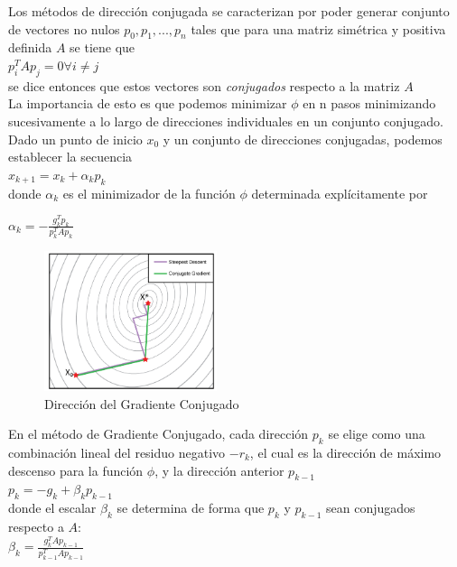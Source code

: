 \documentclass[10pt,journal,compsoc]{styles/IEEEtran}
\begin{document}
Los métodos de dirección conjugada se caracterizan por poder generar conjunto de vectores no nulos ${p_0,p_1,...,p_n}$ tales que para una matriz simétrica y positiva definida $A$ se tiene que\\

$p_i^T A p_j=0 \forall i\neq j$\\

se dice entonces que estos vectores son \emph{conjugados} respecto a la matriz $A$\\

La importancia de esto es que podemos minimizar $\phi$ en n pasos minimizando sucesivamente a lo largo de direcciones individuales en un conjunto conjugado. Dado un punto de inicio $x_0$ y un conjunto de direcciones conjugadas, podemos establecer la secuencia\\

$x_{k+1}=x_k+\alpha_k p_k$\\

donde $\alpha_k$ es el minimizador de la función $\phi$ determinada explícitamente por

$\alpha_k=-\frac{g_k^T p_k}{p_k^T A p_k}$

\begin{figure}[hbtp]
\centering
\includegraphics[width=0.45\textwidth]{conjugateGradient.png}
\caption{Dirección del Gradiente Conjugado}
\end{figure}
 
En el método de Gradiente Conjugado, cada dirección $p_k$ se elige como una combinación lineal del residuo negativo $-r_k$, el cual es la dirección de máximo descenso para la función $\phi$, y la dirección anterior $p_{k-1}$\\

$p_k=-g_k+\beta_k p_{k-1}$\\

donde el escalar $\beta_k$ se determina de forma que $p_k$ y $p_{k-1}$ sean conjugados respecto a $A$:\\

$\beta_k=\frac{g_k^T A p_{k-1}}{p_{k-1}^T A p_{k-1}}$\\
\end{document}

